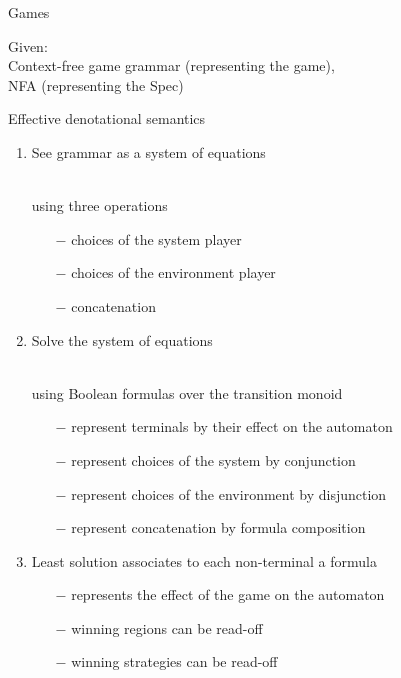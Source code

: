 \documentclass[../talk.tex]{subfiles}
\begin{document}
\begin{frame}{Games}
    \begin{overlayarea}{\slidewidth}{\slideheight}
        Given:
        \\
        \quad Context-free game grammar (representing the game),
        \\
        \quad NFA (representing the Spec)

        \vspace*{1em}


        \alert{Effective denotational semantics}

        \begin{enumerate}
            \item<2-> See grammar as a \alert{system of equations}
                {%
                    \\
                    \quad using three operations
                    \begin{itemize}
                        \item[$-$] choices of the system player
                        \item[$-$] choices of the environment player
                        \item[$-$] concatenation
                    \end{itemize}
                }
            \item<3-> \alert{Solve} the system of equations
                {%
                    \\
                    using Boolean formulas over the transition monoid
                    \begin{itemize}
                        \item[$-$] represent terminals by their effect on the automaton
                        \item[$-$] represent choices of the system by conjunction
                        \item[$-$] represent choices of the environment by disjunction
                        \item[$-$] represent concatenation by \alert{formula composition}
                    \end{itemize}
                }
            \item<4-> Least solution associates to each non-terminal a formula
                {%
                    \begin{itemize}
                        \item[$-$] represents the effect of the game on the automaton
                        \item[$-$] winning regions can be read-off
                        \item[$-$] winning strategies can be read-off
                    \end{itemize}
                }
        \end{enumerate}


\end{overlayarea}
\end{frame}
\end{document}
